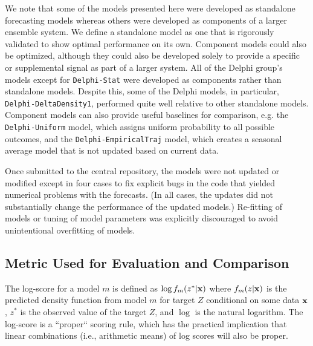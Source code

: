 \documentclass[9pt,twocolumn,twoside]{pnas-new}\usepackage[]{graphicx}\usepackage[]{color}
\begin{document}
{We note that some of the models presented here were developed as standalone forecasting models whereas others were developed as components of a larger ensemble system. We define a standalone model as one that is rigorously validated to show optimal performance on its own. Component models could also be optimized, although they could also be developed solely to provide a specific or supplemental signal as part of a larger system. All of the Delphi group’s models except for {\tt Delphi-Stat} were developed as components rather than standalone models. Despite this, some of the Delphi models, in particular, {\tt Delphi-DeltaDensity1}, performed quite well relative to other standalone models. Component models can also provide useful baselines for comparison, e.g. the {\tt Delphi-Uniform} model, which assigns uniform probability to all possible outcomes, and the {\tt Delphi-EmpiricalTraj} model, which creates a seasonal average model that is not updated based on current data.

Once submitted to the central repository, the models were not updated or modified except in four cases to fix explicit bugs in the code that yielded numerical problems with the forecasts. 
(In all cases, the updates did not substantially change the performance of the updated models.)
Re-fitting of models or tuning of model parameters was explicitly discouraged to avoid unintentional overfitting of models.

\subsection*{Metric Used for Evaluation and Comparison}

The log-score for a model $m$ is defined as $\log f_m(z^*|\bf{x})$ where $f_m(z|\bf{x})$ is the predicted density function from model $m$ for target $Z$ conditional on some data $\bf{x}$, $z^*$ is the observed value of the target $Z$, and $\log$ is the natural logarithm. 
The log-score is a ``proper`` scoring rule, which has the practical implication that linear combinations (i.e., arithmetic means) of log scores will also be proper.\cite{Gneiting2007}

}
\end{document}
